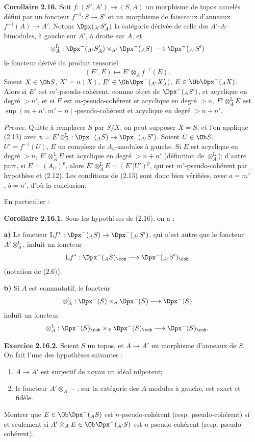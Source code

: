 \documentclass[11pt]{article}
\begin{document}
\textbf{Corollaire 2.16.} Soit \(f:(S',A')\to(S,A)\) un morphisme de topos annelés défini par un foncteur \(f^{-1}:S\to S'\) et un morphisme de faisceaux d'anneaux \(f^{-1}(A)\to A'\). Notons \(\Dpx(_{A'}S'_A)\) la catégorie dérivée de celle des \(A'\)-\(A\)-bimodules, à gauche sur \(A'\), à droite sur \(A\), et
\[
  \otimes_A^{\mathrm L}:\Dpx^-(_{A'}S'_A)\times_{S'}\Dpx^-(_A S)
  \longrightarrow \Dpx^-(_{A'}S')
\]
le foncteur dérivé du produit tensoriel
\[
  (E',E)\longmapsto E'\otimes_A f^{-1}(E).
\]
Soient \(X\in\Ob S\), \(X'=u(X)\), \(E'\in\Ob\Dpx^-(_{A'}X'_A)\), \(E\in\Ob\Dpx^-(_A X)\). Alors si \(E'\) est \(m'\)-pseudo-cohérent, comme objet de \(\Dpx^-(_A S')\), et acyclique en degré \(>n'\), et si \(E\) est \(m\)-pseudo-cohérent et acyclique en degré \(>n\), \(E'\otimes_A^{\mathrm L}E\) est \(\sup(m+n',m'+n)\)-pseudo-cohérent et acyclique en degré \(>n+n'\).

\emph{Preuve.} Quitte à remplacer \(S\) par \(S/X\), on peut supposer \(X=S\), et l'on applique (2.13) avec \(u=E'\otimes_A^{\mathrm L}:\Dpx^-(_A S)\to\Dpx^-(_{A'}S')\). Soient \(U\in\Ob S\), \(U'=f^{-1}(U)\), \(E\) un complexe de \(A_U\)-modules à gauche. Si \(E\) est acyclique en degré \(>n\), \(E'\otimes_A^{\mathrm L}E\) est acyclique en degré \(>n+n'\) (définition de \(\otimes_A^{\mathrm L}\)); d'autre part, si \(E=(A_U)^p\), alors \(E'\otimes_A^{\mathrm L}E=(E'|U')^p\), qui est \(m'\)-pseudo-cohérent par hypothèse et (2.12). Les conditions de (2.13) sont donc bien vérifiées, avec \(a=m'\), \(b=n'\), d'où la conclusion.

En particulier :

\textbf{Corollaire 2.16.1.} Sous les hypothèses de (2.16), on a :

\textbf{a)} Le foncteur \(\mathrm Lf^*: \Dpx^-(_A S)\to \Dpx^-(_{A'}S')\), qui n'est autre que le foncteur \(A'\otimes_A^{\mathrm L}\), induit un foncteur
\[
  \mathrm Lf^*: \Dpx^-(_A S)_{\coh}\longrightarrow \Dpx^-(_{A'}S')_{\coh}
\]
(notation de (2.6)).

\textbf{b)} Si \(A\) est commutatif, le foncteur
\[
  \otimes_A^{\mathrm L}:\Dpx^-(S)\times_S\Dpx^-(S)
  \longrightarrow \Dpx^-(S)
\]
induit un foncteur
\[
  \otimes_A^{\mathrm L}:\Dpx^-(S)_{\coh}\times_S\Dpx^-(S)_{\coh}
  \longrightarrow \Dpx^-(S)_{\coh} .
\]

\textbf{Exercice 2.16.2.} Soient \(S\) un topos, et \(A\to A'\) un morphisme d'anneaux de \(S\). On fait l'une des hypothèses suivantes :
\begin{enumerate}[label=(\roman*)]
\item \(A\to A'\) est surjectif de noyau un idéal nilpotent;
\item le foncteur \(A'\otimes_A-\), sur la catégorie des \(A\)-modules à gauche, est exact et fidèle.
\end{enumerate}
Montrer que \(E\in\Ob\Dpx^-(_A S)\) est \(n\)-pseudo-cohérent (resp. pseudo-cohérent) si et seulement si \(A'\otimes_A E\in\Ob\Dpx^-(_{A'}S)\) est \(n\)-pseudo-cohérent (resp. pseudo-cohérent).
\end{document}
